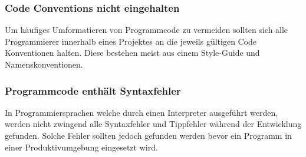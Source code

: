 \subsubsection{Code Conventions nicht eingehalten}
\label{ssub:codeconventions_nicht_eingehalten}
Um häufiges Umformatieren von Programmcode zu vermeiden sollten sich alle Programmierer innerhalb eines Projektes an die jeweils gültigen Code Konventionen halten. Diese bestehen meist aus einem Style-Guide und Namenskonventionen.

\subsubsection{Programmcode enthält Syntaxfehler}
\label{ssub:programmcode_enthält_syntaxfehler}
In Programmiersprachen welche durch einen Interpreter ausgeführt werden, werden nicht zwingend alle Syntaxfehler und Tippfehler während der Entwicklung gefunden. Solche Fehler sollten jedoch gefunden werden bevor ein Programm in einer Produktivumgebung eingesetzt wird.
